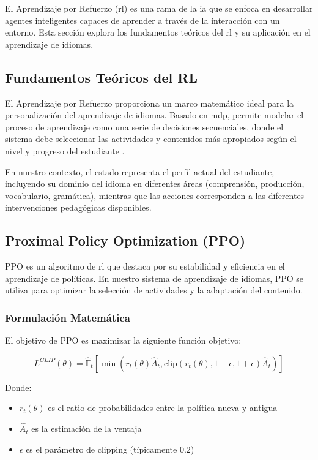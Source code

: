 El Aprendizaje por Refuerzo (\gls{rl}) es una rama de la \gls{ia} que se enfoca en desarrollar agentes inteligentes capaces de aprender a través de la interacción con un entorno. Esta sección explora los fundamentos teóricos del \gls{rl} y su aplicación en el aprendizaje de idiomas.

\subsection{Fundamentos Teóricos del RL}

El Aprendizaje por Refuerzo proporciona un marco matemático ideal para la personalización del aprendizaje de idiomas. Basado en \gls{mdp}, permite modelar el proceso de aprendizaje como una serie de decisiones secuenciales, donde el sistema debe seleccionar las actividades y contenidos más apropiados según el nivel y progreso del estudiante \cite{williams2017educational}.

En nuestro contexto, el estado representa el perfil actual del estudiante, incluyendo su dominio del idioma en diferentes áreas (comprensión, producción, vocabulario, gramática), mientras que las acciones corresponden a las diferentes intervenciones pedagógicas disponibles.

\subsection{Proximal Policy Optimization (PPO)}

PPO \cite{schulman2017proximal} es un algoritmo de \gls{rl} que destaca por su estabilidad y eficiencia en el aprendizaje de políticas. En nuestro sistema de aprendizaje de idiomas, PPO se utiliza para optimizar la selección de actividades y la adaptación del contenido.


\subsubsection{Formulación Matemática}
El objetivo de PPO es maximizar la siguiente función objetivo:

\begin{equation}
  L^{CLIP}(\theta) = \hat{\mathbb{E}}_t[\min(r_t(\theta)\hat{A}_t, \text{clip}(r_t(\theta), 1-\epsilon, 1+\epsilon)\hat{A}_t)]
\end{equation}

Donde:

\begin{itemize}
  \item $r_t(\theta)$ es el ratio de probabilidades entre la política nueva y antigua
  \item $\hat{A}_t$ es la estimación de la ventaja
  \item $\epsilon$ es el parámetro de clipping (típicamente 0.2)
\end{itemize}

